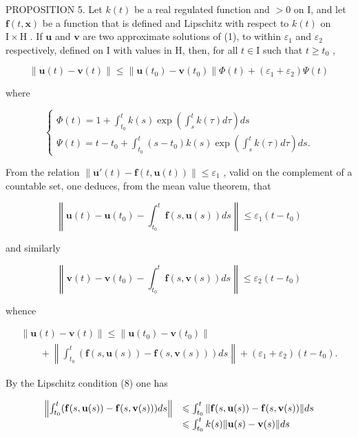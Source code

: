 PROPOSITION 5. Let \(k(t)\) be a real regulated function and \(>0\) on I, and let \(\mathbf{f}(t, \mathbf{x})\) be a function that is defined and Lipschitz with respect to \(k(t)\) on \(\mathrm{I} \times \mathrm{H}\) . If \(\mathbf{u}\) and \(\mathbf{v}\) are two approximate solutions of (1), to within \(\varepsilon_1\) and \(\varepsilon_2\) respectively, defined on I with values in H, then, for all \(t \in \mathrm{I}\) such that \(t \geqslant t_0\) ,

\[
\left\| \mathbf {u} (t) - \mathbf {v} (t) \right\| \leqslant \left\| \mathbf {u} \left(t _ {0}\right) - \mathbf {v} \left(t _ {0}\right) \right\| \Phi (t) + \left(\varepsilon_ {1} + \varepsilon_ {2}\right) \Psi (t)\tag{9}
\]

where

\[
\left\{ \begin{array}{l} \Phi (t) = 1 + \int_ {t _ {0}} ^ {t} k (s) \exp \left(\int_ {s} ^ {t} k (\tau) d \tau\right) d s \\ \Psi (t) = t - t _ {0} + \int_ {t _ {0}} ^ {t} (s - t _ {0}) k (s) \exp \left(\int_ {s} ^ {t} k (\tau) d \tau\right) d s. \end{array} \right.\tag{10}
\]

From the relation \(\left\| \mathbf{u}'(t) - \mathbf{f}(t, \mathbf{u}(t)) \right\| \leqslant \varepsilon_1\) , valid on the complement of a countable set, one deduces, from the mean value theorem, that

\[
\left\| \mathbf {u} (t) - \mathbf {u} (t _ {0}) - \int_ {t _ {0}} ^ {t} \mathbf {f} (s, \mathbf {u} (s)) d s \right\| \leqslant \varepsilon_ {1} (t - t _ {0})
\]

and similarly

\[
\left\| \mathbf {v} (t) - \mathbf {v} (t _ {0}) - \int_ {t _ {0}} ^ {t} \mathbf {f} (s, \mathbf {v} (s)) d s \right\| \leqslant \varepsilon_ {2} (t - t _ {0})
\]

whence

\[
\begin{array}{l} \| \mathbf {u} (t) - \mathbf {v} (t) \| \leqslant \| \mathbf {u} (t _ {0}) - \mathbf {v} (t _ {0}) \| \\ \qquad + \left\| \int_ {t _ {0}} ^ {t} (\mathbf {f} (s, \mathbf {u} (s)) - \mathbf {f} (s, \mathbf {v} (s))) d s \right\| + (\varepsilon_ {1} + \varepsilon_ {2}) (t - t _ {0}). \end{array}
\]

By the Lipschitz condition (8) one has

\[
\begin{array}{r l} \left\| \int_ {t _ {0}} ^ {t} (\mathbf {f} (s, \mathbf {u} (s)) - \mathbf {f} (s, \mathbf {v} (s))) d s \right\| & \leqslant \int_ {t _ {0}} ^ {t} \| \mathbf {f} (s, \mathbf {u} (s)) - \mathbf {f} (s, \mathbf {v} (s)) \| d s \\ & \leqslant \int_ {t _ {0}} ^ {t} k (s) \| \mathbf {u} (s) - \mathbf {v} (s) \| d s \end{array}
\]

